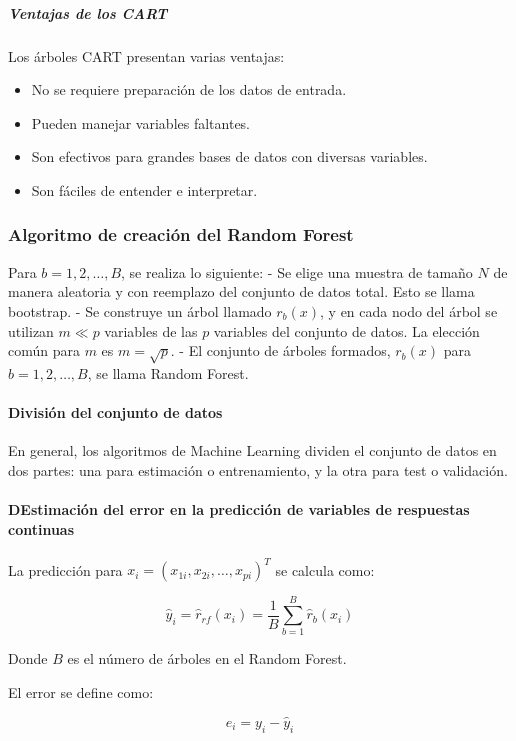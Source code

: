 \subparagraph{Ventajas de los CART}
Los árboles CART presentan varias ventajas:
\begin{itemize}
	\item No se requiere preparación de los datos de entrada.
	\item Pueden manejar variables faltantes.
	\item Son efectivos para grandes bases de datos con diversas variables.
	\item Son fáciles de entender e interpretar.
\end{itemize}

\subsubsection{Algoritmo de creación del Random Forest}

Para \(b = 1,2, \ldots, B\), se realiza lo siguiente:
- Se elige una muestra de tamaño \(N\) de manera aleatoria y con reemplazo del conjunto de datos total. Esto se llama bootstrap.
- Se construye un árbol llamado \(r_b(x)\), y en cada nodo del árbol se utilizan \(m \ll p\) variables de las \(p\) variables del conjunto de datos. La elección común para \(m\) es \(m = \sqrt{p}\).
- El conjunto de árboles formados, \(r_b(x)\) para \(b = 1,2, \ldots, B\), se llama Random Forest.

\paragraph{División del conjunto de datos}

En general, los algoritmos de Machine Learning dividen el conjunto de datos en dos partes: una para estimación o entrenamiento, y la otra para test o validación.

\paragraph{DEstimación del error en la predicción de variables de respuestas continuas}

La predicción para \(x_i = (x_{1i}, x_{2i}, \ldots, x_{pi})^T\) se calcula como:

\[ \hat{y}_i = \hat{r}_{rf}(x_i) = \frac{1}{B} \sum_{b=1}^{B} \hat{r}_b(x_i) \]

Donde \(B\) es el número de árboles en el Random Forest.

El error se define como:

\[ e_i = y_i - \hat{y}_i \]


